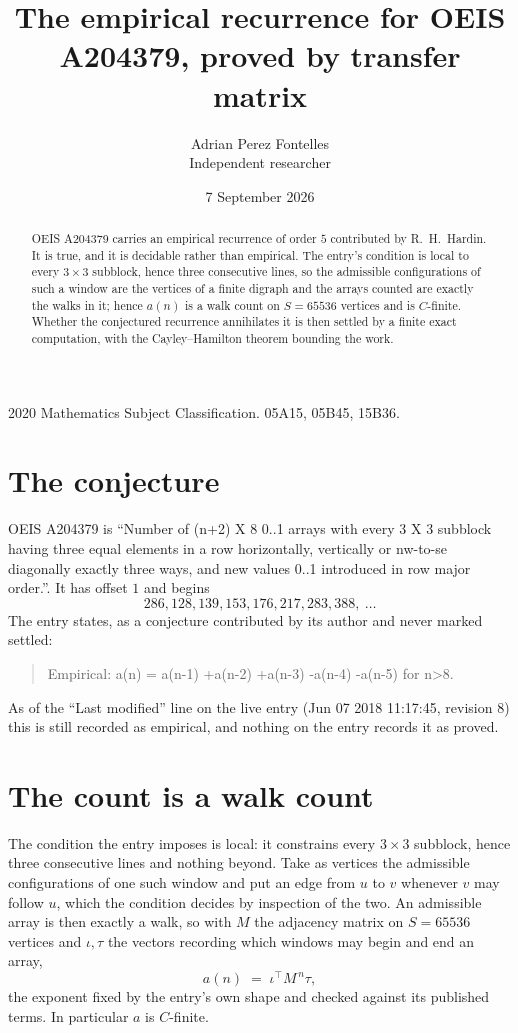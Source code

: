 \documentclass[11pt,a4paper]{article}
\title{The empirical recurrence for OEIS A204379, proved by transfer matrix}
\author{Adrian Perez Fontelles\\ \small Independent researcher}
\date{7 September 2026}
\theoremstyle{plain}
\theoremstyle{definition}
\begin{document}
\maketitle

\begin{abstract}
OEIS A204379 carries an empirical recurrence of order $5$ contributed by R.~H.~Hardin. It is
true, and it is decidable rather than empirical. The entry's condition is local to every $3\times3$ subblock, hence three consecutive lines, so
the admissible configurations of such a window are the vertices of a finite digraph and the
arrays counted are exactly the walks in it; hence $a(n)$ is a walk count on $S=65536$ vertices
and is $C$-finite. Whether the conjectured recurrence annihilates it is then settled by a
finite exact computation, with the Cayley--Hamilton theorem bounding the work.
\end{abstract}

\noindent\small 2020 Mathematics Subject Classification. 05A15, 05B45, 15B36.\normalsize

\section{The conjecture}

OEIS A204379 is ``Number of (n+2) X 8 0..1 arrays with every 3 X 3 subblock having three equal elements in a row horizontally, vertically or nw-to-se diagonally exactly three ways, and new values 0..1 introduced in row major order.''. It has offset $1$ and begins
\[
286, 128, 139, 153, 176, 217, 283, 388,\ \dots
\]
The entry states, as a conjecture contributed by its author and never marked settled:
\begin{quote}
Empirical: a(n) = a(n-1) +a(n-2) +a(n-3) -a(n-4) -a(n-5) for n>8.
\end{quote}
As of the ``Last modified'' line on the live entry (Jun 07 2018 11:17:45, revision 8) this is still
recorded as empirical, and nothing on the entry records it as proved.

\section{The count is a walk count}

The condition the entry imposes is local: it constrains every $3\times3$ subblock, hence three consecutive lines and nothing beyond. Take as
vertices the admissible configurations of one such window and put an edge from $u$ to $v$
whenever $v$ may follow $u$, which the condition decides by inspection of the two. An
admissible array is then exactly a walk, so with $M$ the adjacency matrix on $S=65536$ vertices
and $\iota,\tau$ the vectors recording which windows may begin and end an array,
\[
a(n)\;=\;\iota^{\!\top}M^{\,n}\tau ,
\]
the exponent fixed by the entry's own shape and checked against its published terms. In
particular $a$ is $C$-finite.
\end{document}
